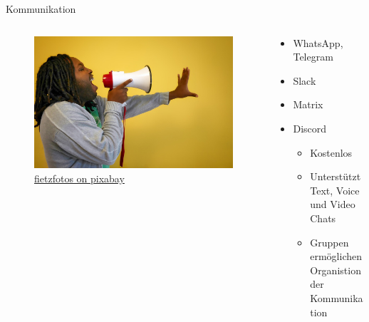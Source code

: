 \documentclass[aspectratio=169,shownotes]{beamer}
\begin{document}
\begin{frame}{Kommunikation}
    \begin{columns}[t]
        \begin{column}{0.4\textwidth}
            \vspace{-2em} 
            \begin{figure}
                \begin{flushleft}
                    \includegraphics[height=0.8\textheight,trim={4cm 0 17cm 0},clip]{graphics/call-2946023_1280.jpg}
                    \caption*{\href{https://pixabay.com/photos/call-afro-megaphone-scream-symbol-2946023/}{fietzfotos on pixabay}}    
                \end{flushleft}                
            \end{figure}            
        \end{column}
        \begin{column}{0.6\textwidth}
            \begin{itemize}
                \item WhatsApp, Telegram
                \item Slack
                \item Matrix        
                \item Discord
                \begin{itemize}
                    \item Kostenlos
                    \item Unterstützt Text, Voice und Video Chats
                    \item Gruppen ermöglichen Organistion der Kommunikation
                \end{itemize}    
            \end{itemize}
        \end{column}
    \end{columns}
\end{frame}
\end{document}
